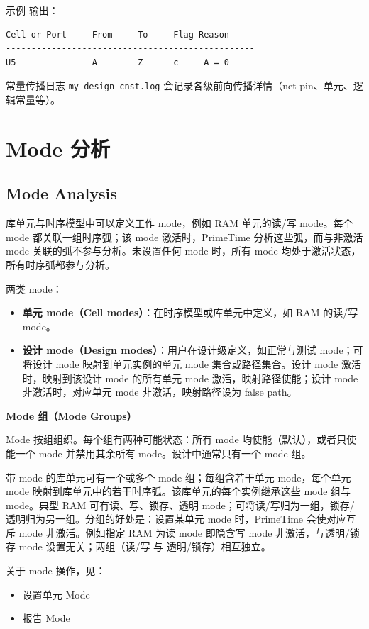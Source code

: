 示例  输出：
\begin{lstlisting}
Cell or Port     From     To     Flag Reason
-------------------------------------------------
U5               A        Z      c     A = 0
\end{lstlisting}

常量传播日志 \texttt{my\_design\_cnst.log} 会记录各级前向传播详情（net pin、单元、逻辑常量等）。

\section{Mode 分析}
\subsection*{Mode Analysis}

库单元与时序模型中可以定义工作 mode，例如 RAM 单元的读/写 mode。每个 mode 都关联一组时序弧；该 mode 激活时，PrimeTime 分析这些弧，而与非激活 mode 关联的弧不参与分析。未设置任何 mode 时，所有 mode 均处于激活状态，所有时序弧都参与分析。

两类 mode：
\begin{itemize}
  \item \textbf{单元 mode（Cell modes）}：在时序模型或库单元中定义，如 RAM 的读/写 mode。
  \item \textbf{设计 mode（Design modes）}：用户在设计级定义，如正常与测试 mode；可将设计 mode 映射到单元实例的单元 mode 集合或路径集合。设计 mode 激活时，映射到该设计 mode 的所有单元 mode 激活，映射路径使能；设计 mode 非激活时，对应单元 mode 非激活，映射路径设为 false path。
\end{itemize}

\textbf{Mode 组（Mode Groups）}

Mode 按组组织。每个组有两种可能状态：所有 mode 均使能（默认），或者只使能一个 mode 并禁用其余所有 mode。设计中通常只有一个 mode 组。

带 mode 的库单元可有一个或多个 mode 组；每组含若干单元 mode，每个单元 mode 映射到库单元中的若干时序弧。该库单元的每个实例继承这些 mode 组与 mode。典型 RAM 可有读、写、锁存、透明 mode；可将读/写归为一组，锁存/透明归为另一组。分组的好处是：设置某单元 mode 时，PrimeTime 会使对应互斥 mode 非激活。例如指定 RAM 为读 mode 即隐含写 mode 非激活，与透明/锁存 mode 设置无关；两组（读/写 与 透明/锁存）相互独立。

关于 mode 操作，见：
\begin{itemize}
  \item 设置单元 Mode
  \item 报告 Mode
\end{itemize}

